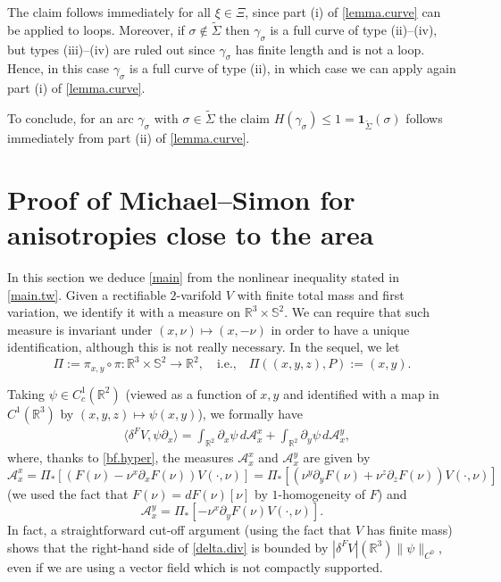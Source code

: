 \documentclass[11pt,a4paper]{amsart}
\newcommand{\R}{\mathbb{R}}
\newcommand{\de}{\partial}
\newcommand{\ang}[1]{\langle#1\rangle}
\newcommand{\uno}{\bm{1}}
\newcommand{\nin}{\not\in}
\theoremstyle{definition}
\newcommand{\A}{\mathcal{A}}
\begin{document}
The claim follows immediately for all $\xi\in\Xi$, since part (i) of \cref{lemma.curve}
can be applied to loops.
Moreover, if $\sigma\nin\tilde\Sigma$ then $\gamma_\sigma$ is a full curve of type (ii)--(iv), but
types (iii)--(iv) are ruled out since $\gamma_\sigma$ has finite length and is not a loop.
Hence, in this case $\gamma_\sigma$ is a full curve of type (ii), in which case
we can apply again part (i) of \cref{lemma.curve}.

To conclude, for an arc $\gamma_\sigma$ with $\sigma\in\tilde\Sigma$ the claim $H(\gamma_\sigma)\le1=\uno_{\tilde\Sigma}(\sigma)$ follows immediately
from part (ii) of \cref{lemma.curve}.

\section{Proof of Michael--Simon for anisotropies close to the area}\label{sec.applications}

In this section we deduce \cref{main} from the nonlinear inequality stated in \cref{main.tw}.
Given a rectifiable $2$-varifold $V$ with finite total mass and first variation,
we identify it with a measure on $\R^3\times \mathbb{S}^2$. We can require that such measure is invariant under
$(x,\nu)\mapsto(x,-\nu)$ in order to have a unique identification, although this is not really necessary.
In the sequel, we let
$$\Pi:=\pi_{x,y}\circ\pi:\R^3\times \mathbb{S}^2\to\R^2,\quad\text{i.e.,}\quad \Pi((x,y,z),P):=(x,y).$$

Taking $\psi\in C^1_c(\R^2)$ (viewed as a function of $x,y$ and identified with
a map in $C^1(\R^3)$ by $(x,y,z)\mapsto\psi(x,y)$), we formally have
\begin{align}\label{delta.div}
	&\ang{\delta^F V,\psi\de_x}=\int_{\R^2} \de_x \psi\,d\A_x^x+\int_{\R^2}\de_y \psi\,d\A_x^y,
\end{align}
where, thanks to \cref{bf.hyper}, the measures $\A_x^x$ and $\A_x^y$ are given by
\begin{equation}\label{A}\A_x^x=\Pi_*[(F(\nu)-\nu^x\de_xF(\nu))V(\cdot,\nu)]
=\Pi_*[(\nu^y\de_yF(\nu)+\nu^z\de_zF(\nu))V(\cdot,\nu)]\end{equation}
(we used the fact that $F(\nu)=dF(\nu)[\nu]$ by $1$-homogeneity of $F$) and
\begin{equation}\label{B}\A_x^y=\Pi_*[-\nu^x\de_yF(\nu)V(\cdot,\nu)].\end{equation}
In fact, a straightforward cut-off argument (using the fact that $V$ has finite mass) shows that the right-hand side of \cref{delta.div} is bounded by $|\delta^F V|(\R^3)\|\psi\|_{C^0}$, even if we are using a vector field which is not compactly supported.
\end{document}
